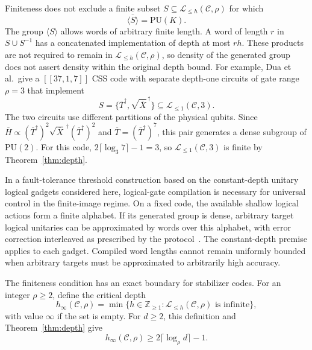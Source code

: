 \documentclass[aps,prl,reprint,notitlepage,nofootinbib,nobibnotes]{revtex4-2}
\newcommand{\PU}{\mathrm{PU}}
\begin{document}
Finiteness does not exclude a finite subset \(S\subseteq\mathcal L_{\le h}(\mathcal C,\rho)\)
for which
\[
 \overline{\langle S\rangle}=\PU(K).
\]
The group \(\langle S\rangle\) allows words of arbitrary finite length.
A word of length \(r\) in \(S\cup S^{-1}\) has a concatenated
implementation of depth at most \(rh\). These products are not required
to remain in \(\mathcal L_{\le h}(\mathcal C,\rho)\), so density of the generated group does not
assert density within the original depth bound.
For example, Dua et al.\ give a \([[37,1,7]]\) CSS code with separate depth-one
circuits of gate range \(\rho=3\) that
implement~\cite[Sec.~V and Appendix~B~3]{Dua}
\[
 S=\bigl\{\overline T^\dagger,
          \sqrt{\overline X}^{\,\dagger}\bigr\}
   \subseteq\mathcal L_{\le1}(\mathcal C,3).
\]
The two circuits use different partitions of the physical qubits.
Since \(\overline H\propto
(\overline T^\dagger)^2\sqrt{\overline X}^{\,\dagger}
(\overline T^\dagger)^2\) and
\(\overline T=(\overline T^\dagger)^7\), this pair generates a dense
subgroup of \(\PU(2)\). For this code,
\(2\lceil\log_3 7\rceil-1=3\), so \(\mathcal L_{\le1}(\mathcal C,3)\) is finite by
Theorem~\ref{thm:depth}.


In a fault-tolerance threshold construction based on the constant-depth
unitary logical gadgets considered here, logical-gate compilation is
necessary for universal control in the finite-image regime. On a fixed
code, the available shallow logical actions form a finite alphabet. If
its generated group is dense, arbitrary target logical unitaries can be
approximated by words over this alphabet, with error correction
interleaved as prescribed by the protocol~\cite{Gottesman,Dua}. The
constant-depth premise applies to each gadget. Compiled word lengths cannot
remain uniformly bounded when arbitrary targets must be approximated to
arbitrarily high accuracy.

The finiteness condition has an exact boundary for stabilizer codes. For an integer \(\rho\ge2\), define the critical depth
\begin{equation}\label{eq:critical-definition}
 h_\infty(\mathcal C,\rho)
  =\min\{h\in\mathbb Z_{\ge1}:\mathcal L_{\le h}(\mathcal C,\rho)
                   \text{ is infinite}\},
\end{equation}
with value \(\infty\) if the set is empty. For \(d\ge2\),
this definition and Theorem~\ref{thm:depth} give
\begin{equation}\label{eq:critical-lower}
 h_\infty(\mathcal C,\rho)\ge2\lceil\log_{\rho} d\rceil-1.
\end{equation}
\end{document}
